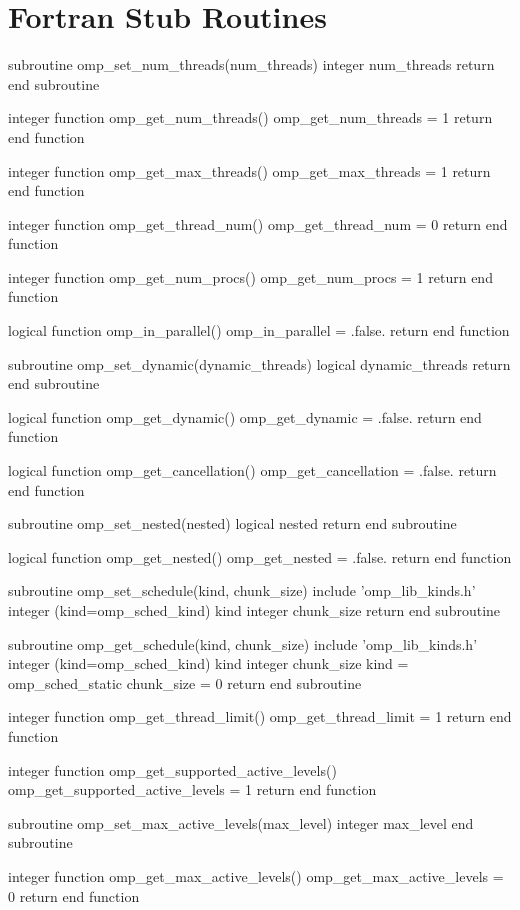\section{Fortran Stub Routines}
\label{sec:Fortran Stub Routines}
{\small \begin{ompfFunction}
subroutine omp_set_num_threads(num_threads)
  integer num_threads
  return
end subroutine

integer function omp_get_num_threads()
  omp_get_num_threads = 1
  return
end function

integer function omp_get_max_threads()
  omp_get_max_threads = 1
  return
end function

integer function omp_get_thread_num()
  omp_get_thread_num = 0
  return
end function

integer function omp_get_num_procs()
  omp_get_num_procs = 1
  return
end function

logical function omp_in_parallel()
  omp_in_parallel = .false.
  return
end function

subroutine omp_set_dynamic(dynamic_threads)
  logical dynamic_threads
  return
end subroutine

logical function omp_get_dynamic()
  omp_get_dynamic = .false.
  return
end function

logical function omp_get_cancellation()
  omp_get_cancellation = .false.
  return
end function

subroutine omp_set_nested(nested)
  logical nested
  return
end subroutine

logical function omp_get_nested()
  omp_get_nested = .false.
  return
end function

subroutine omp_set_schedule(kind, chunk_size)
  include 'omp_lib_kinds.h'
  integer (kind=omp_sched_kind) kind
  integer chunk_size
  return
end subroutine

subroutine omp_get_schedule(kind, chunk_size)
  include 'omp_lib_kinds.h'
  integer (kind=omp_sched_kind) kind
  integer chunk_size
  kind = omp_sched_static
  chunk_size = 0
  return
end subroutine

integer function omp_get_thread_limit()
  omp_get_thread_limit = 1
  return
end function

integer function omp_get_supported_active_levels()
  omp_get_supported_active_levels = 1
  return
end function

subroutine omp_set_max_active_levels(max_level)
  integer max_level
end subroutine

integer function omp_get_max_active_levels()
  omp_get_max_active_levels = 0
  return
end function


\end{ompfFunction}}

